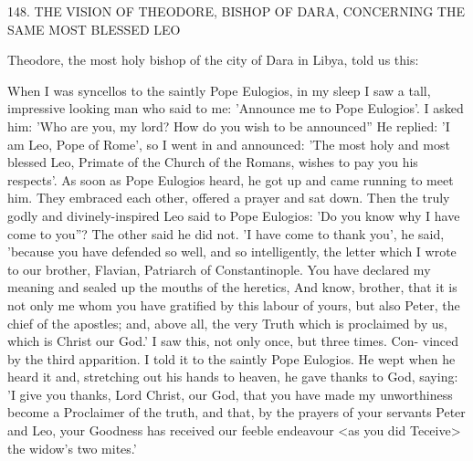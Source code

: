 148. THE VISION OF THEODORE,
BISHOP OF DARA,
CONCERNING THE SAME MOST BLESSED LEO

Theodore, the most holy bishop of the city of Dara in Libya, told
us this:

When I was syncellos to the saintly Pope Eulogios, in my sleep I
saw a tall, impressive looking man who said to me: 'Announce me
to Pope Eulogios'. I asked him: 'Who are you, my lord? How do
you wish to be announced” He replied: 'I am Leo, Pope of Rome',
so I went in and announced: 'The most holy and most blessed Leo,
Primate of the Church of the Romans, wishes to pay you his
respects'. As soon as Pope Eulogios heard, he got up and came
running to meet him. They embraced each other, offered a prayer
and sat down. Then the truly godly and divinely-inspired Leo said
to Pope Eulogios: 'Do you know why I have come to you”? The
other said he did not. 'I have come to thank you', he said, 'because
you have defended so well, and so intelligently, the letter which I
wrote to our brother, Flavian, Patriarch of Constantinople. You
have declared my meaning and sealed up the mouths of the heretics,
And know, brother, that it is not only me whom you have gratified
by this labour of yours, but also Peter, the chief of the apostles;
and, above all, the very Truth which is proclaimed by us, which is
Christ our God.' I saw this, not only once, but three times. Con-
vinced by the third apparition. I told it to the saintly Pope Eulogios.
He wept when he heard it and, stretching out his hands to heaven,
he gave thanks to God, saying: 'I give you thanks, Lord Christ, our
God, that you have made my unworthiness become a Proclaimer of
the truth, and that, by the prayers of your servants Peter and Leo,
your Goodness has received our feeble endeavour <as you did
Teceive> the widow's two mites.'

